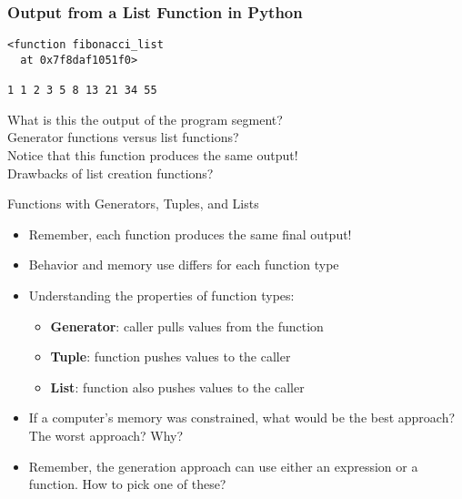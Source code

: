 \documentclass[14pt,aspectratio=169]{beamer}
\begin{document}
%
\begin{frame}[fragile]
  \frametitle{Output from a List Function in Python}
  \normalsize
  \begin{minipage}{6in}
    \vspace*{.1in}
    \begin{verbatim}
<function fibonacci_list
  at 0x7f8daf1051f0>

1 1 2 3 5 8 13 21 34 55
    \end{verbatim}
  \vspace*{.05in}
  \begin{center}
    \normalsize \noindent What is this the output of the program segment? \\
    \normalsize \noindent Generator functions versus list functions? \\
    \normalsize \noindent Notice that this function produces the same output! \\
    \normalsize \noindent Drawbacks of list creation functions? \\
  \end{center}
  \end{minipage}
\end{frame}

%
\begin{frame}{Functions with Generators, Tuples, and Lists}
  \begin{itemize}
    \item Remember, each function produces the same final output!
      \vspace*{-.15in}
    \item Behavior and memory use differs for each function type
      \vspace*{-.15in}
    \item Understanding the properties of function types:
      \begin{itemize}
        \item {\bf Generator}: caller pulls values from the function
        \item {\bf Tuple}: function pushes values to the caller
        \item {\bf List}: function also pushes values to the caller
      \end{itemize}
      \vspace*{-.2in}
    \item If a computer's memory was constrained, what would be the best
      approach? The worst approach? Why?
      \vspace*{-.2in}
    \item Remember, the generation approach can use either an expression or a
      function. How to pick one of these?
  \end{itemize}
\end{frame}
\end{document}
